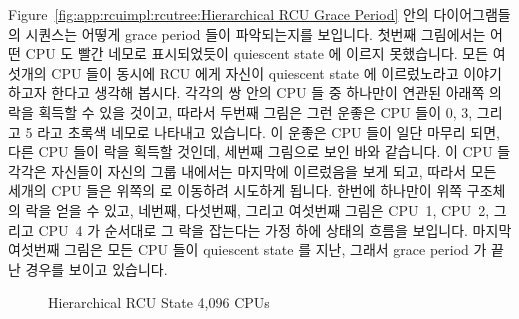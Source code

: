 Figure~\ref{fig:app:rcuimpl:rcutree:Hierarchical RCU Grace Period}
안의 다이어그램들의 시퀀스는 어떻게 grace period 들이 파악되는지를 보입니다.
첫번째 그림에서는 어떤 CPU 도 빨간 네모로 표시되었듯이 quiescent state 에
이르지 못했습니다.
모든 여섯개의 CPU 들이 동시에 RCU 에게 자신이 quiescent state 에 이르렀노라고
이야기하고자 한다고 생각해 봅시다.
각각의 쌍 안의 CPU 들 중 하나만이 연관된 아래쪽  의 락을 획득할 수
있을 것이고, 따라서 두번째 그림은 그런 운좋은 CPU 들이 0, 3, 그리고 5 라고
초록색 네모로 나타내고 있습니다.
이 운좋은 CPU 들이 일단 마무리 되면, 다른 CPU 들이 락을 획득할 것인데, 세번째
그림으로 보인 바와 같습니다.
이 CPU 들 각각은 자신들이 자신의 그룹 내에서는 마지막에 이르렀음을 보게 되고,
따라서 모든 세개의 CPU 들은 위쪽의  로 이동하려 시도하게 됩니다.
한번에 하나만이 위쪽  구조체의 락을 얻을 수 있고, 네번째,
다섯번째, 그리고 여섯번째 그림은 CPU~1, CPU~2, 그리고 CPU~4 가 순서대로 그 락을
잡는다는 가정 하에 상태의 흐름을 보입니다.
마지막 여섯번째 그림은 모든 CPU 들이 quiescent state 를 지난, 그래서 grace
period 가 끝난 경우를 보이고 있습니다.
\iffalse

The sequence of diagrams in
Figure~\ref{fig:app:rcuimpl:rcutree:Hierarchical RCU Grace Period}
shows how grace periods are detected.
In the first figure, no CPU has yet passed through a quiescent state,
as indicated by the red rectangles.
Suppose that all six CPUs simultaneously try to tell RCU that they have
passed through a quiescent state.
Only one of each pair will be able to acquire the lock on the
corresponding lower \co{rcu_node}, and so the second figure
shows the result if the lucky CPUs are numbers 0, 3, and 5, as indicated
by the green rectangles.
Once these lucky CPUs have finished, then the other CPUs will acquire
the lock, as shown in the third figure.
Each of these CPUs will see that they are the last in their group,
and therefore all three will attempt to move to the upper
\co{rcu_node}.
Only one at a time can acquire the upper \co{rcu_node} structure's
lock, and the fourth, fifth, and sixth figures show the sequence of
states assuming that CPU~1, CPU~2, and CPU~4 acquire
the lock in that order.
The sixth and final figure in the group shows that all CPUs have passed
through a quiescent state, so that the grace period has ended.
\fi

\begin{figure}[htb]
\centering
{}
\caption{Hierarchical RCU State 4,096 CPUs}
\label{fig:app:rcuimpl:rcutree:Hierarchical RCU State 4,096 CPUs}
\end{figure}

